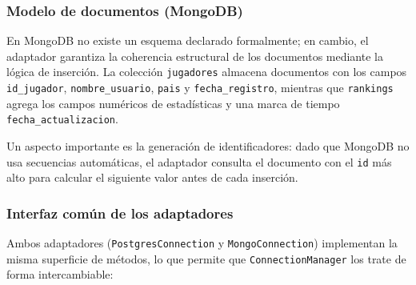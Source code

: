 \documentclass[12pt,letterpaper]{article}
\begin{document}
\subsubsection{Modelo de documentos (MongoDB)}

En MongoDB no existe un esquema declarado formalmente; en cambio, el adaptador garantiza
la coherencia estructural de los documentos mediante la lógica de inserción. La colección
\texttt{jugadores} almacena documentos con los campos \texttt{id\_jugador}, \texttt{nombre\_usuario},
\texttt{pais} y \texttt{fecha\_registro}, mientras que \texttt{rankings} agrega los campos
numéricos de estadísticas y una marca de tiempo \texttt{fecha\_actualizacion}.

Un aspecto importante es la generación de identificadores: dado que MongoDB no usa
secuencias automáticas, el adaptador consulta el documento con el \texttt{id} más alto
para calcular el siguiente valor antes de cada inserción.

\subsubsection{Interfaz común de los adaptadores}

Ambos adaptadores (\texttt{PostgresConnection} y \texttt{MongoConnection}) implementan la
misma superficie de métodos, lo que permite que \texttt{ConnectionManager} los trate de forma
intercambiable:
\end{document}
